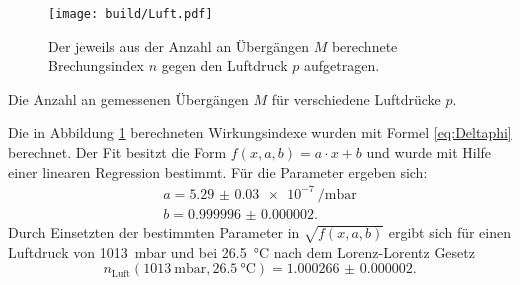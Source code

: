 \begin{figure}
	\centering
	\texttt{[image: build/Luft.pdf]}
	\caption{Der jeweils aus der Anzahl an Übergängen $M$ berechnete Brechungsindex $n$ gegen den Luftdruck $p$ aufgetragen.}
	\label{fig:Luft}
\end{figure}
\begin{table}
	\centering
	\caption{Die Anzahl an gemessenen Übergängen $M$ für verschiedene Luftdrücke $p$.}
	
\end{table}
Die in Abbildung \ref{fig:Luft} berechneten Wirkungsindexe wurden mit Formel \eqref{eq:Deltaphi} berechnet. Der Fit besitzt die Form $f(x,a,b) =a\cdot x +b$ und wurde mit Hilfe einer linearen Regression bestimmt. Für die Parameter ergeben sich:
\begin{gather*}
	a=\SI{5.29(3)e-7}{\per\milli\bar}\\
	b=\num{0.999996(2)}.
\end{gather*}
Durch Einsetzten der bestimmten Parameter in $\sqrt{f(x,a,b)}$ ergibt sich für einen Luftdruck von \SI{1013}{\milli\bar} und bei \SI{26.5}{\degreeCelsius} nach dem Lorenz-Lorentz Gesetz
\begin{displaymath}
 n_\text{Luft}(\SI{1013}{\milli\bar},\SI{26.5}{\degreeCelsius})=\num{1.000266(2)}.
\end{displaymath}